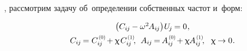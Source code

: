 \begin{otherlanguage}{russian}

,
рассмотрим
задачу
об~определении
собственных частот и~форм\::

\nopagebreak\vspace{-0.5em}\begin{equation}\begin{array}{c}
\bigl( C_{i\hspace{-0.1ex}j} \hspace{-0.1ex} - \omega^2 \hspace{-0.2ex} A_{i\hspace{-0.1ex}j} \bigr) \hspace{.1ex} U_{\hspace{-0.2ex}j} \hspace{-0.15ex} = 0 \hspace{.1ex} ,
\\[.4em]
%
C_{i\hspace{-0.1ex}j} \hspace{-0.2ex} = C_{i\hspace{-0.1ex}j}^{\hspace{.2ex}\scalebox{.66}{(0)}} \hspace{-0.3ex} + \smallparameter \hspace{.2ex} C_{i\hspace{-0.1ex}j}^{\hspace{.2ex}\scalebox{.66}{(1)}}
\hspace{-0.4ex} ,
\hspace{1ex}
A_{i\hspace{-0.1ex}j} \hspace{-0.2ex} = \hspace{-0.2ex} A_{i\hspace{-0.1ex}j}^{\hspace{.2ex}\scalebox{.66}{(0)}} \hspace{-0.3ex} + \smallparameter \hspace{-0.1ex} A_{i\hspace{-0.1ex}j}^{\hspace{.2ex}\scalebox{.66}{(1)}}
\hspace{-0.4ex} ,
\hspace{1.5ex}
\smallparameter \hspace{-0.12ex} \to 0
\hspace{.1ex} .
\end{array}\end{equation}


\end{otherlanguage}
